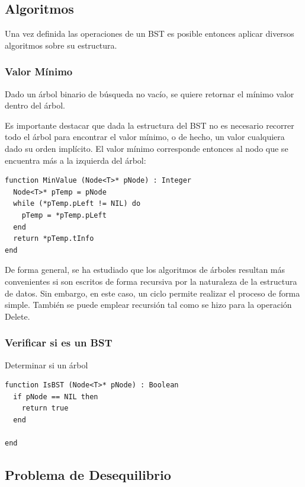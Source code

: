 \subsection{Algoritmos}

Una vez definida las operaciones de un BST es posible entonces aplicar diversos algoritmos sobre su estructura.

\subsubsection{Valor Mínimo}

Dado un árbol binario de búsqueda no vacío, se quiere retornar el mínimo valor dentro del árbol.

Es importante destacar que dada la estructura del BST no es necesario recorrer todo el árbol para encontrar el valor mínimo, o de hecho, un valor cualquiera dado su orden implícito. El valor mínimo corresponde entonces al nodo que se encuentra más a la izquierda del árbol:

\begin{lstlisting}[upquote=true, language=pseudo]
function MinValue (Node<T>* pNode) : Integer
  Node<T>* pTemp = pNode
  while (*pTemp.pLeft != NIL) do
    pTemp = *pTemp.pLeft
  end
  return *pTemp.tInfo
end
\end{lstlisting}

De forma general, se ha estudiado que los algoritmos de árboles resultan más convenientes si son escritos de forma recursiva por la naturaleza de la estructura de datos. Sin embargo, en este caso, un ciclo permite realizar el proceso de forma simple. También se puede emplear recursión tal como se hizo para la operación Delete.

\subsubsection{Verificar si es un BST}

Determinar si un árbol

\begin{lstlisting}[upquote=true, language=pseudo]
function IsBST (Node<T>* pNode) : Boolean
  if pNode == NIL then
    return true
  end
  
end
\end{lstlisting}

\subsection{Problema de Desequilibrio}

